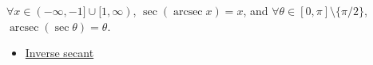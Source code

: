 \begin{remark*}
$\forall x\in(-\infty,-1]\cup[1,\infty)$, $\sec(\operatorname{arcsec} x)=x$, and
$\forall \theta\in[0,\pi]\setminus\{\pi/2\}$, $\operatorname{arcsec}(\sec\theta)=\theta$.
\end{remark*}
\begin{dependencies}
\begin{itemize}
  \item \hyperref[def:inverse-secant]{Inverse secant}
\end{itemize}
\end{dependencies}
